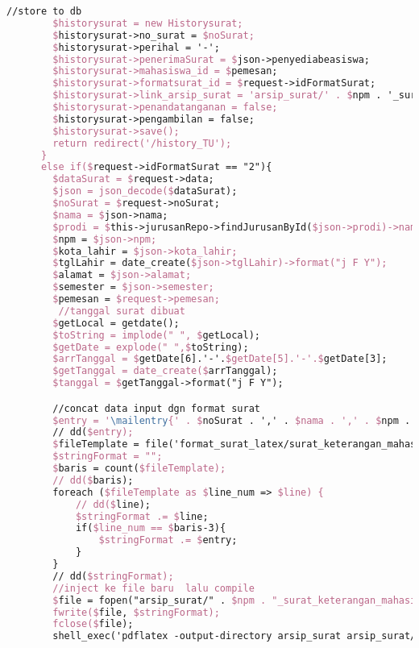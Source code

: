 \begin{lstlisting}[language=tex,basicstyle=\tiny,caption=HistorysuratController.php]
        //store to db
        $historysurat = new Historysurat;
        $historysurat->no_surat = $noSurat;
        $historysurat->perihal = '-';
        $historysurat->penerimaSurat = $json->penyediabeasiswa;
        $historysurat->mahasiswa_id = $pemesan;
        $historysurat->formatsurat_id = $request->idFormatSurat;
        $historysurat->link_arsip_surat = 'arsip_surat/' . $npm . '_surat_keterangan_beasiswa.pdf';
        $historysurat->penandatanganan = false;
        $historysurat->pengambilan = false;
        $historysurat->save();
        return redirect('/history_TU');
      }
      else if($request->idFormatSurat == "2"){
        $dataSurat = $request->data;
        $json = json_decode($dataSurat);
        $noSurat = $request->noSurat;
        $nama = $json->nama;
        $prodi = $this->jurusanRepo->findJurusanById($json->prodi)->nama_jurusan;
        $npm = $json->npm;
        $kota_lahir = $json->kota_lahir;
        $tglLahir = date_create($json->tglLahir)->format("j F Y");
        $alamat = $json->alamat;
        $semester = $json->semester;
        $pemesan = $request->pemesan;
         //tanggal surat dibuat
        $getLocal = getdate();
        $toString = implode(" ", $getLocal);
        $getDate = explode(" ",$toString);
        $arrTanggal = $getDate[6].'-'.$getDate[5].'-'.$getDate[3];
        $getTanggal = date_create($arrTanggal);
        $tanggal = $getTanggal->format("j F Y");

        //concat data input dgn format surat
        $entry = '\mailentry{' . $noSurat . ',' . $nama . ',' . $npm . ',' . $prodi . ',' . $kota_lahir . ',' . $tglLahir . ',' . $alamat . ',' . $semester . ',' . $tanggal . '}';
        // dd($entry);
        $fileTemplate = file('format_surat_latex/surat_keterangan_mahasiswa_aktif.tex');
        $stringFormat = "";
        $baris = count($fileTemplate);
        // dd($baris);
        foreach ($fileTemplate as $line_num => $line) {
            // dd($line);
            $stringFormat .= $line;
            if($line_num == $baris-3){
                $stringFormat .= $entry;
            }
        }
        // dd($stringFormat);
        //inject ke file baru  lalu compile
        $file = fopen("arsip_surat/" . $npm . "_surat_keterangan_mahasiswa_aktif.tex", "w");
        fwrite($file, $stringFormat);
        fclose($file);
        shell_exec('pdflatex -output-directory arsip_surat arsip_surat/' . $npm . '_surat_keterangan_mahasiswa_aktif.tex');


\end{lstlisting}
